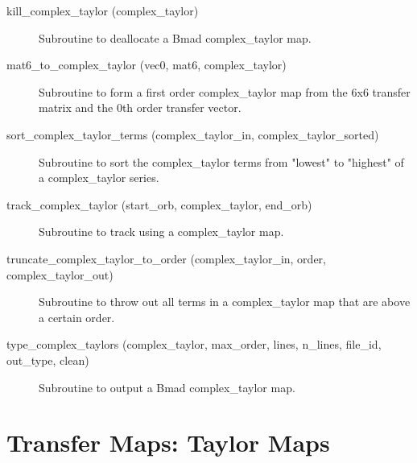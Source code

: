 \begin{description}
\label{r:kill.complex.taylor}
\item[kill_complex_taylor (complex_taylor)] \Newline 
Subroutine to deallocate a Bmad complex_taylor map.

\label{r:mat6.to.complex.taylor}
\item[mat6_to_complex_taylor (vec0, mat6, complex_taylor)] \Newline 
Subroutine to form a first order complex_taylor map from the 6x6 transfer
matrix and the 0th order transfer vector.

\label{r:sort.complex.taylor.terms}
\item[sort_complex_taylor_terms (complex_taylor_in, complex_taylor_sorted)] \Newline 
Subroutine to sort the complex_taylor terms from "lowest" to "highest" of
a complex_taylor series.

\label{r:track.complex.taylor}
\item[track_complex_taylor (start_orb, complex_taylor, end_orb)] \Newline 
Subroutine to track using a complex_taylor map.

\label{r:truncate.complex.taylor.to.order}
\item[truncate_complex_taylor_to_order (complex_taylor_in, order, complex_taylor_out)] \Newline 
Subroutine to throw out all terms in a complex_taylor map that are above a certain order.

\label{r:type.complex.taylors}
\item[type_complex_taylors (complex_taylor, max_order, lines, n_lines, file_id, out_type, clean)] \Newline 
Subroutine to output a Bmad complex_taylor map.

\end{description}

\section{Transfer Maps: Taylor Maps}
\label{r:taylor}   

